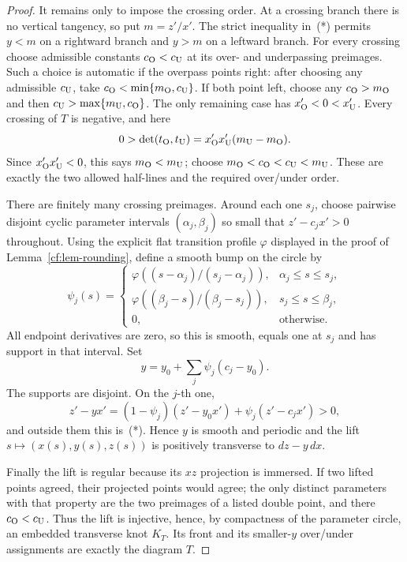 \begin{proof}
It remains only to impose the crossing order.  At a crossing branch there is
no vertical tangency, so put $m=z'/x'$.  The strict inequality in~(*) permits
$y<m$ on a rightward branch and $y>m$ on a leftward branch.  For every crossing
choose admissible constants $c_{\rm O}<c_{\rm U}$ at its over- and underpassing
preimages.  Such a choice is automatic if the overpass points right: after
choosing any admissible $c_{\rm U}$, take
$c_{\rm O}<\min\{m_{\rm O},c_{\rm U}\}$.  If both point left, choose any
$c_{\rm O}>m_{\rm O}$ and then
$c_{\rm U}>\max\{m_{\rm U},c_{\rm O}\}$.  The only remaining case has
$x'_{\rm O}<0<x'_{\rm U}$.  Every crossing of $T$ is negative, and here
\[
 0>\det(t_{\rm O},t_{\rm U})
   =x'_{\rm O}x'_{\rm U}(m_{\rm U}-m_{\rm O}).
\]
Since $x'_{\rm O}x'_{\rm U}<0$, this says $m_{\rm O}<m_{\rm U}$; choose
$m_{\rm O}<c_{\rm O}<c_{\rm U}<m_{\rm U}$.  These are exactly the two allowed
half-lines and the required over/under order.

There are finitely many crossing preimages.  Around each one $s_j$, choose
pairwise disjoint cyclic parameter intervals $(\alpha_j,\beta_j)$ so small that
$z'-c_jx'>0$ throughout.  Using the explicit flat transition profile
$\varphi$ displayed in the proof of Lemma~\ref{cf:lem-rounding}, define a smooth
bump on the circle by
\[
 \psi_j(s)=
 \begin{cases}
 \varphi\!\left((s-\alpha_j)/(s_j-\alpha_j)\right),&
       \alpha_j\le s\le s_j,\\
 \varphi\!\left((\beta_j-s)/(\beta_j-s_j)\right),&
       s_j\le s\le\beta_j,\\
 0,&\text{otherwise}.
 \end{cases}
\]
All endpoint derivatives are zero, so this is smooth, equals one at $s_j$ and
has support in that interval.  Set
\[
 y=y_0+\sum_j\psi_j(c_j-y_0).
\]
The supports are disjoint.  On the $j$-th one,
\[
 z'-yx'=(1-\psi_j)(z'-y_0x')+\psi_j(z'-c_jx')>0,
\]
and outside them this is~(*).  Hence $y$ is smooth and periodic and the lift
$s\mapsto(x(s),y(s),z(s))$ is positively transverse to $dz-y\,dx$.

Finally the lift is regular because its $xz$ projection is immersed.  If two
lifted points agreed, their projected points would agree; the only distinct
parameters with that property are the two preimages of a listed double point,
and there $c_{\rm O}<c_{\rm U}$.  Thus the lift is injective, hence, by
compactness of the parameter circle, an embedded transverse knot $K_T$.
Its front and its smaller-$y$ over/under assignments are exactly the
diagram $T$.


\end{proof}
